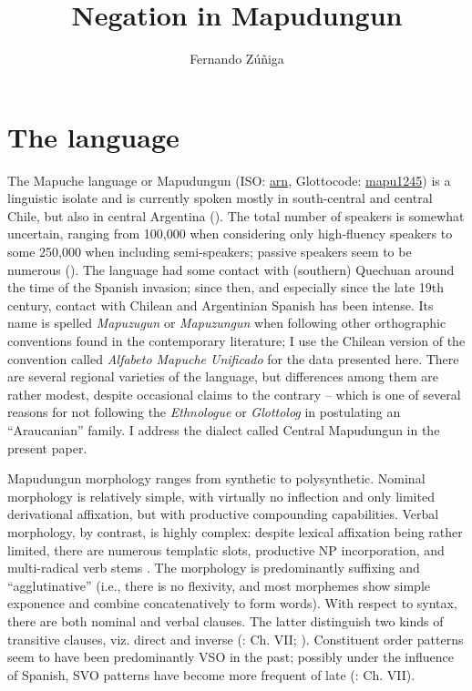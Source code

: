 \documentclass[output=paper,colorlinks,citecolor=brown,draft]{langscibook}
\author{Fernando Zúñiga\affiliation{University of Bern}}
\title{Negation in Mapudungun}
\begin{document}
\maketitle 

\section{The language}

The Mapuche language or Mapudungun (ISO: \href{https://iso639-3.sil.org/code/arn}{arn}, Glottocode: \href{https://glottolog.org/resource/languoid/id/mapu1245}{mapu1245}) is a linguistic isolate and is currently spoken mostly in south-central and central Chile, but also in central Argentina (\citealt{SimonsFennig2018}). The total number of speakers is somewhat uncertain, ranging from 100,000 when considering only high-fluency speakers to some 250,000 when including semi-speakers; passive speakers seem to be numerous (\citealt{ZúñigaOlate2017}). The language had some contact with (southern) Quechuan around the time of the Spanish invasion; since then, and especially since the late 19th century, contact with Chilean and Argentinian Spanish has been intense. Its name is spelled \textit{Mapuzugun} or \textit{Mapuzungun} when following other orthographic conventions found in the contemporary literature; I use the Chilean version of the convention called \textit{Alfabeto Mapuche Unificado} for the data presented here. There are several regional varieties of the language, but differences among them are rather modest, despite occasional claims to the contrary – which is one of several reasons for not following the \textit{Ethnologue} or \textit{Glottolog} in postulating an “Araucanian” family. I address the dialect called Central Mapudungun in the present paper.

Mapudungun morphology ranges from synthetic to polysynthetic. Nominal morphology is relatively simple, with virtually no inflection and only limited derivational affixation, but with productive compounding capabilities. Verbal morphology, by contrast, is highly complex: despite lexical affixation being rather limited, there are numerous templatic slots, productive NP incorporation, and multi-radical verb stems \citep{Zúñiga2017}. The morphology is predominantly suffixing and “agglutinative” (i.e., there is no flexivity, and most morphemes show simple exponence and combine concatenatively to form words). With respect to syntax, there are both nominal and verbal clauses. The latter distinguish two kinds of transitive clauses, viz. direct and inverse (\citealt{Zúñiga2006}: Ch. VII; \citealt{HaudeZúñiga2016}). Constituent order patterns seem to have been predominantly VSO in the past; possibly under the influence of Spanish, SVO patterns have become more frequent of late (\citealt{Zúñiga2006}: Ch. VII).
\end{document}
